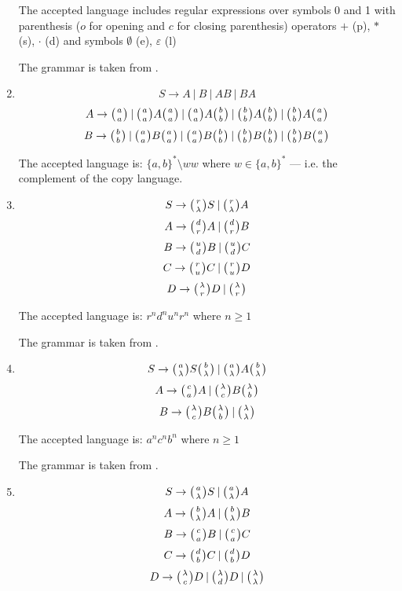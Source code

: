 \begin{enumerate}
{    The accepted language includes regular expressions over symbols 0 and 1 with parenthesis ($o$ for opening and $c$ for closing parenthesis) operators $+$ (p), $*$ (s), $\cdot$ (d) and symbols $\emptyset$ (e), $\varepsilon$ (l)

    The grammar is taken from \cite{GRAMMAR_10}.
  }

  \item{
    $$S \rightarrow A \:|\: B \:|\: A B \:|\: B A$$
    $$A \rightarrow \wkpair{a}{a} \:|\: \wkpair{a}{a} A \wkpair{a}{a} \:|\: \wkpair{a}{a} A \wkpair{b}{b} \:|\: \wkpair{b}{b} A \wkpair{b}{b} \:|\: \wkpair{b}{b} A \wkpair{a}{a}$$
    $$B \rightarrow \wkpair{b}{b} \:|\: \wkpair{a}{a} B \wkpair{a}{a} \:|\: \wkpair{a}{a} B \wkpair{b}{b} \:|\: \wkpair{b}{b} B \wkpair{b}{b} \:|\: \wkpair{b}{b} B \wkpair{a}{a}$$

    The accepted language is: $\{a, b\}^* \setminus ww$ where $w \in \{a, b\}^*$ --- i.e. the complement of the copy language.
  }

  \item{
    $$S \rightarrow \wkpair{r}{\lambda} S \:|\: \wkpair{r}{\lambda} A$$
    $$A \rightarrow \wkpair{d}{r} A \:|\: \wkpair{d}{r} B$$
    $$B \rightarrow \wkpair{u}{d} B \:|\: \wkpair{u}{d} C$$
    $$C \rightarrow \wkpair{r}{u} C \:|\: \wkpair{r}{u} D$$
    $$D \rightarrow \wkpair{\lambda}{r} D \:|\: \wkpair{\lambda}{r}$$

    The accepted language is: $r^nd^nu^nr^n$ where $n \geq 1$

    The grammar is taken from \cite{REG_GRAMMAR}.
  }

  \item{
    $$S \rightarrow \wkpair{a}{\lambda} S \wkpair{b}{\lambda} \:|\: \wkpair{a}{\lambda} A \wkpair{b}{\lambda}$$
    $$A \rightarrow \wkpair{c}{a} A \:|\: \wkpair{\lambda}{c} B \wkpair{\lambda}{b}$$
    $$B \rightarrow \wkpair{\lambda}{c} B \wkpair{\lambda}{b} \:|\: \wkpair{\lambda}{\lambda}$$

    The accepted language is: $a^nc^nb^n$ where $n \geq 1$

    The grammar is taken from \cite{WK_GRAMMARS_1}.

  }

  \item{
    $$S \rightarrow \wkpair{a}{\lambda} S \:|\: \wkpair{a}{\lambda} A$$
    $$A \rightarrow \wkpair{b}{\lambda} A \:|\: \wkpair{b}{\lambda} B$$
    $$B \rightarrow \wkpair{c}{a} B \:|\: \wkpair{c}{a} C$$
    $$C \rightarrow \wkpair{d}{b} C \:|\: \wkpair{d}{b} D$$
    $$D \rightarrow \wkpair{\lambda}{c} D \:|\: \wkpair{\lambda}{d} D \:|\: \wkpair{\lambda}{\lambda}$$

}
\end{enumerate}
